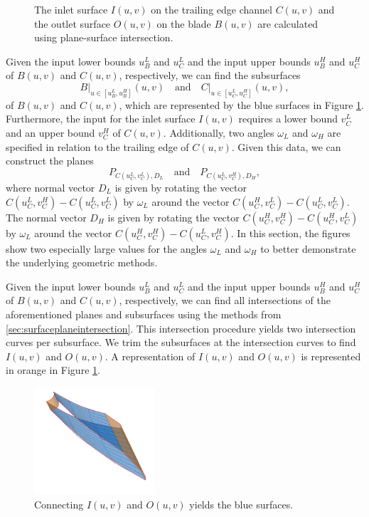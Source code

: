 \documentclass[a4paper, 11pt]{report}
\theoremstyle{definition}
\newcommand{\domrestr}{\big|}
\begin{document}
\begin{figure}[H]
\begin{subfigure}{.45\textwidth}
		\end{subfigure}
		\caption{The inlet surface $I(u,v)$ on the trailing edge channel $C(u,v)$ and the outlet surface $O(u,v)$ on the blade $B(u,v)$ are calculated using plane-surface intersection.}
		\label{fig:slot_plane_intersection}
	\end{figure}

	Given the input lower bounds $u_B^L$ and $u_C^L$ and the input upper bounds $u_B^H$ and $u_C^H$ of $B(u,v)$ and $C(u,v)$, respectively, we can find the subsurfaces
		$$ B\domrestr_{u \in [u_B^L, u_B^H]}(u,v) \quad\text{and}\quad C\domrestr_{u \in [u_C^L, u_C^H]}(u,v),$$
	of $B(u,v)$ and $C(u,v)$, which are represented by the blue surfaces in Figure \ref{fig:slot_plane_intersection}.
	Furthermore, the input for the inlet surface $I(u,v)$ requires a lower bound $v_C^L$ and an upper bound $v_C^H$ of $C(u,v)$. Additionally, two angles $\omega_L$ and $\omega_H$ are specified in relation to the trailing edge of $C(u,v)$. Given this data, we can construct the planes
		$$ P_{C(u_C^L,v_C^L), D_L} \quad\text{and}\quad P_{C(u_C^L, v_C^H), D_H},$$
	where normal vector $D_L$ is given by rotating the vector $C(u_C^L, v_C^H)-C(u_C^L, v_C^L)$ by $\omega_L$ around the vector $C(u_C^H, v_C^L) - C(u_C^L, v_C^L)$. The normal vector $D_H$ is given by rotating the vector $C(u_C^H, v_C^H)-C(u_C^H, v_C^L)$ by $\omega_L$ around the vector $C(u_C^H, v_C^H) - C(u_C^L, v_C^H)$. In this section, the figures show two especially large values for the angles $\omega_L$ and $\omega_H$ to better demonstrate the underlying geometric methods.

	Given the input lower bounds $u_B^L$ and $u_C^L$ and the input upper bounds $u_B^H$ and $u_C^H$ of $B(u,v)$ and $C(u,v)$, respectively, we can find all intersections of the aforementioned planes and subsurfaces using the methods from \ref{sec:surfaceplaneintersection}. This intersection procedure yields two intersection curves per subsurface. We trim the subsurfaces at the intersection curves to find $I(u,v)$ and $O(u,v)$. A representation of $I(u,v)$ and $O(u,v)$ is represented in orange in Figure \ref{fig:slot_plane_intersection}.

	\begin{figure}[H]
		\centering
		\includegraphics[width=0.4\textwidth]{../tec/slots/16.png}
		\caption{Connecting $I(u,v)$ and $O(u,v)$ yields the blue surfaces.}
		\label{fig:slot_connection}
	\end{figure}
\end{document}
